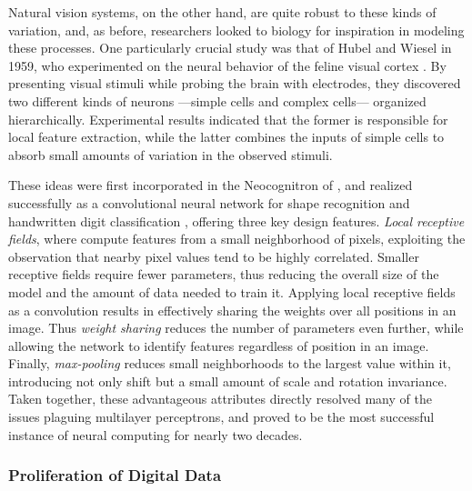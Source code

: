 Natural vision systems, on the other hand, are quite robust to these kinds of variation, and, as before, researchers looked to biology for inspiration in modeling these processes.
One particularly crucial study was that of Hubel and Wiesel in 1959, who experimented on the neural behavior of the feline visual cortex \cite{}.
By presenting visual stimuli while probing the brain with electrodes, they discovered two different kinds of neurons ---simple cells and complex cells--- organized hierarchically.
Experimental results indicated that the former is responsible for local feature extraction, while the latter combines the inputs of simple cells to absorb small amounts of variation in the observed stimuli.

These ideas were first incorporated in the Neocognitron of \cite{Fukushima1988}, and realized successfully as a convolutional neural network for shape recognition and handwritten digit classification \cite{LeCun1990, LeCun1998},  offering three key design features.
\emph{Local receptive fields}, where compute features from a small neighborhood of pixels, exploiting the observation that nearby pixel values tend to be highly correlated.
Smaller receptive fields require fewer parameters, thus reducing the overall size of the model and the amount of data needed to train it.
Applying local receptive fields as a convolution results in effectively sharing the weights over all positions in an image.
Thus \emph{weight sharing} reduces the number of parameters even further, while allowing the network to identify features regardless of position in an image.
Finally, \emph{max-pooling} reduces small neighborhoods to the largest value within it, introducing not only shift but a small amount of scale and rotation invariance.
Taken together, these advantageous attributes directly resolved many of the issues plaguing multilayer perceptrons, and proved to be the most successful instance of neural computing for nearly two decades.


\subsubsection{Proliferation of Digital Data}
\label{subsec:perceptrons}

